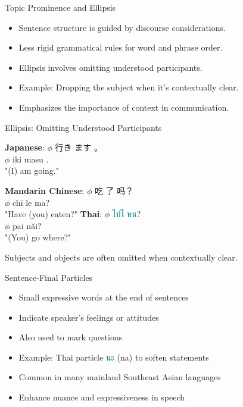 \documentclass{beamer}
\newcommand{\mtplain}[1]{\textcolor{teal}{#1}}
\newcommand{\tha}[1]{\mtplain{\textthai{#1}}}
\begin{document}
\begin{frame}{Topic Prominence and Ellipsis}
    \begin{itemize}
        \item Sentence structure is guided by discourse considerations.
        \item Less rigid grammatical rules for word and phrase order.
        \item Ellipsis involves omitting understood participants.
        \item Example: Dropping the subject when it's contextually clear.
        \item Emphasizes the importance of context in communication.
    \end{itemize}
\end{frame}
\begin{frame}{Ellipsis: Omitting Understood Participants}
  \begin{exe}
    \ex \textbf{Japanese}:
    \gll  $\phi$ 行き ます 。  \\
    $\phi$ iki masu . \\
    \glt  "(I) am going."

   \ex \textbf{Mandarin Chinese}:
                 \gll  $\phi$ 吃 了 吗？ \\
                 $\phi$ chī le ma? \\
                 \glt"Have (you) eaten?"
         \ex \textbf{Thai}:
                 \gll  $\phi$ \tha{ไปไ} \tha{หน}? \\
                 $\phi$ pai năi? \\
                \glt "(You) go where?"
     \end{exe}
Subjects and objects are often omitted when contextually clear.

  \end{frame}

\begin{frame}{Sentence-Final Particles}
    \begin{itemize}
        \item Small expressive words at the end of sentences
        \item Indicate speaker's feelings or attitudes
        \item Also used to mark questions
        \item Example: Thai particle \tha{นะ} (na) to soften statements
        \item Common in many mainland Southeast Asian languages
        \item Enhance nuance and expressiveness in speech
    \end{itemize}
  \end{frame}
  
\end{document}
